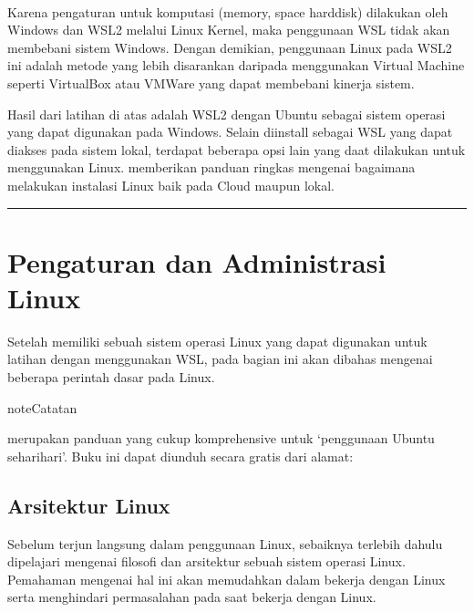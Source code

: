 \documentclass[letterpaper,10pt,english]{sphinxmanual}
\begin{document}
 

Karena pengaturan  untuk komputasi (memory, space harddisk) dilakukan  oleh Windows dan WSL2 melalui Linux Kernel, maka penggunaan WSL tidak akan membebani sistem Windows. Dengan demikian, penggunaan Linux pada WSL2 ini adalah metode yang lebih disarankan daripada menggunakan Virtual Machine seperti VirtualBox atau VMWare yang dapat membebani kinerja sistem.

Hasil dari latihan di atas adalah WSL2 dengan Ubuntu sebagai sistem operasi yang dapat digunakan pada Windows. Selain diinstall sebagai WSL yang dapat diakses pada sistem lokal, terdapat beberapa opsi lain yang daat dilakukan untuk menggunakan Linux.  memberikan panduan ringkas mengenai bagaimana melakukan instalasi Linux baik pada Cloud maupun lokal.


\bigskip\hrule\bigskip



\section{Pengaturan dan Administrasi Linux}
\label{\detokenize{sesi1/arsitektur:pengaturan-dan-administrasi-linux}}\label{\detokenize{sesi1/arsitektur::doc}}
Setelah memiliki sebuah sistem operasi Linux yang dapat digunakan untuk latihan dengan menggunakan WSL, pada bagian ini akan dibahas mengenai beberapa perintah dasar pada Linux.

\begin{sphinxadmonition}{note}{Catatan}

 merupakan panduan yang cukup komprehensive untuk ‘penggunaan Ubuntu sehari\sphinxhyphen{}hari’. Buku ini dapat diunduh secara gratis dari alamat: 
\end{sphinxadmonition}


\subsection{Arsitektur Linux}
\label{\detokenize{sesi1/arsitektur:arsitektur-linux}}
Sebelum terjun langsung dalam penggunaan Linux, sebaiknya terlebih dahulu dipelajari mengenai filosofi dan arsitektur sebuah sistem operasi Linux. Pemahaman mengenai hal ini akan memudahkan dalam bekerja dengan Linux serta menghindari permasalahan pada saat bekerja dengan Linux.
\end{document}
